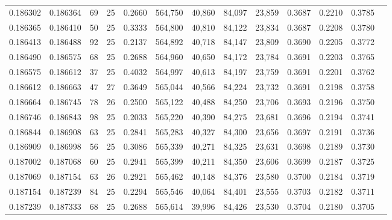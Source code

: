 \begin{tabular}{rrrrrrrrrrrrr}
0.186302 & 0.186364 &  69 &  25 &                                     0.2660 & 564,750 &  40,860 &  84,097 &  23,859 & 0.3687 & 0.2210 & 0.3785 \\
0.186365 & 0.186410 &  50 &  25 &                                     0.3333 & 564,800 &  40,810 &  84,122 &  23,834 & 0.3687 & 0.2208 & 0.3780 \\
0.186413 & 0.186488 &  92 &  25 &                                     0.2137 & 564,892 &  40,718 &  84,147 &  23,809 & 0.3690 & 0.2205 & 0.3772 \\
0.186490 & 0.186575 &  68 &  25 &                                     0.2688 & 564,960 &  40,650 &  84,172 &  23,784 & 0.3691 & 0.2203 & 0.3765 \\
0.186575 & 0.186612 &  37 &  25 &                                     0.4032 & 564,997 &  40,613 &  84,197 &  23,759 & 0.3691 & 0.2201 & 0.3762 \\
0.186612 & 0.186663 &  47 &  27 &                                     0.3649 & 565,044 &  40,566 &  84,224 &  23,732 & 0.3691 & 0.2198 & 0.3758 \\
0.186664 & 0.186745 &  78 &  26 &                                     0.2500 & 565,122 &  40,488 &  84,250 &  23,706 & 0.3693 & 0.2196 & 0.3750 \\
0.186746 & 0.186843 &  98 &  25 &                                     0.2033 & 565,220 &  40,390 &  84,275 &  23,681 & 0.3696 & 0.2194 & 0.3741 \\
0.186844 & 0.186908 &  63 &  25 &                                     0.2841 & 565,283 &  40,327 &  84,300 &  23,656 & 0.3697 & 0.2191 & 0.3736 \\
0.186909 & 0.186998 &  56 &  25 &                                     0.3086 & 565,339 &  40,271 &  84,325 &  23,631 & 0.3698 & 0.2189 & 0.3730 \\
0.187002 & 0.187068 &  60 &  25 &                                     0.2941 & 565,399 &  40,211 &  84,350 &  23,606 & 0.3699 & 0.2187 & 0.3725 \\
0.187069 & 0.187154 &  63 &  26 &                                     0.2921 & 565,462 &  40,148 &  84,376 &  23,580 & 0.3700 & 0.2184 & 0.3719 \\
0.187154 & 0.187239 &  84 &  25 &                                     0.2294 & 565,546 &  40,064 &  84,401 &  23,555 & 0.3703 & 0.2182 & 0.3711 \\
0.187239 & 0.187333 &  68 &  25 &                                     0.2688 & 565,614 &  39,996 &  84,426 &  23,530 & 0.3704 & 0.2180 & 0.3705 \\

\end{tabular}
